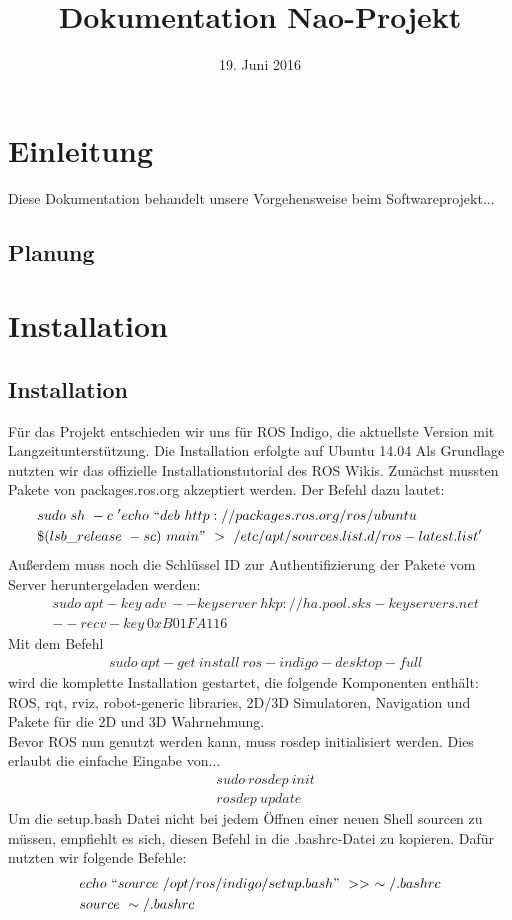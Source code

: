 \documentclass{scrartcl}
\title{Dokumentation Nao-Projekt}
\date{19. Juni 2016}
\begin{document}
\maketitle
\tableofcontents
\newpage

\section{Einleitung}

Diese Dokumentation behandelt unsere Vorgehensweise beim Softwareprojekt...

\subsection{Planung}


\section{Installation}


\subsection{Installation}

Für das Projekt entschieden wir uns für ROS Indigo, die aktuellste Version mit Langzeitunterstützung.
Die Installation erfolgte auf Ubuntu 14.04 
Als Grundlage nutzten wir das offizielle Installationstutorial des ROS Wikis.
Zunächst mussten Pakete von packages.ros.org akzeptiert werden. Der Befehl dazu lautet: 
\begin{align}
&sudo\ sh\ -c\ 'echo\ ``deb\ http://packages.ros.org/ros/ubuntu \\ 
&\$(lsb\_release\ -sc)\ main"\ >\ /etc/apt/sources.list.d/ros-latest.list'
\end{align}
Außerdem muss noch die Schlüssel ID  zur Authentifizierung der Pakete vom Server heruntergeladen werden:
\begin{align}
&sudo\ apt-key\ adv\ --keyserver\ hkp://ha.pool.sks-keyservers.net\\ 
& --recv-key\ 0xB01FA116
\end{align}
Mit dem Befehl 
\begin{align}
&sudo\ apt-get\ install\ ros-indigo-desktop-full
\end{align}
wird die komplette Installation gestartet, die folgende Komponenten enthält: ROS, rqt, rviz, robot-generic libraries, 2D/3D Simulatoren, Navigation und Pakete für die 2D und 3D Wahrnehmung.
\\
Bevor ROS nun genutzt werden kann, muss rosdep initialisiert werden. Dies erlaubt die einfache Eingabe von...
\begin{align}
&sudo\ rosdep\ init\\
&rosdep\ update
\end{align}
Um die setup.bash Datei nicht bei jedem Öffnen einer neuen Shell sourcen zu müssen, empfiehlt es sich, diesen Befehl in die .bashrc-Datei zu kopieren.
Dafür nutzten wir folgende Befehle:
\begin{align}
&echo\ ``source\ /opt/ros/indigo/setup.bash"\ >>\ \sim/.bashrc\\
&source\ \sim/.bashrc
\end{align}
\end{document}
